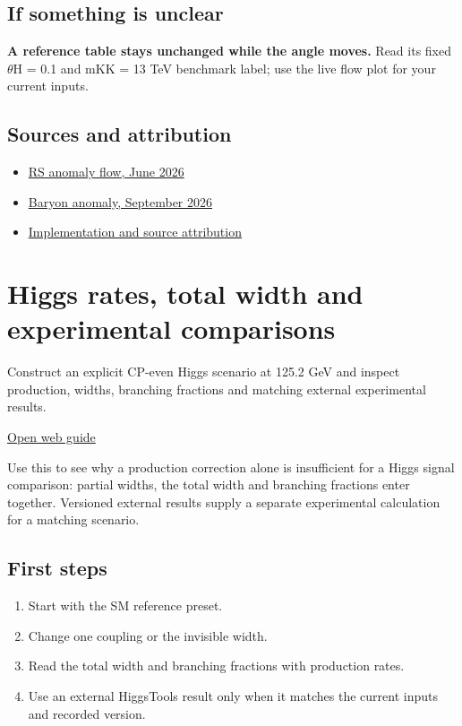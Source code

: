 \documentclass[11pt,a4paper]{article}
\begin{document}
\subsection*{If something is unclear}
\textbf{A reference table stays unchanged while the angle moves.} Read its fixed \ensuremath{\theta}H = 0.1 and mKK = 13 TeV benchmark label; use the live flow plot for your current inputs.

\subsection*{Sources and attribution}
\begin{itemize}
\item \href{https://arxiv.org/abs/2606.01829}{RS anomaly flow, June 2026}
\item \href{https://arxiv.org/abs/2609.29135}{Baryon anomaly, September 2026}
\item \href{https://github.com/karlesmarin/ghu-lab/blob/main/src/modules/rs_anomaly.mjs}{Implementation and source attribution}
\end{itemize}
\section{Higgs rates, total width and experimental comparisons}
Construct an explicit CP-even Higgs scenario at 125.2 GeV and inspect production, widths, branching fractions and matching external experimental results.

\href{https://karlesmarin.github.io/ghu-explorer/guide/higgstools/index.html}{Open web guide}

Use this to see why a production correction alone is insufficient for a Higgs signal comparison: partial widths, the total width and branching fractions enter together. Versioned external results supply a separate experimental calculation for a matching scenario.
\subsection*{First steps}
\begin{enumerate}
\item Start with the SM reference preset.
\item Change one coupling or the invisible width.
\item Read the total width and branching fractions with production rates.
\item Use an external HiggsTools result only when it matches the current inputs and recorded version.
\end{enumerate}
\end{document}
